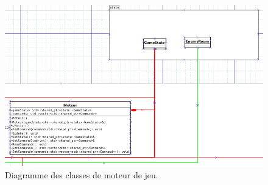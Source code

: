 \begin{figure}[p]
\includegraphics[width=0.5\paperheight]{images/engine2.png}
\caption{\label{uml:engine}Diagramme des classes de moteur de jeu.} 
\end{figure}
\newpage